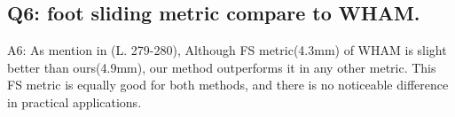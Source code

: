 \documentclass{article}
\begin{document}
\subsection{Q6: foot sliding metric compare to WHAM.}\label{q6-foot-sliding-metric-compare-to-wham.}

A6: As mention in (L. 279-280), Although FS metric(4.3mm) of WHAM is slight better than ours(4.9mm), our method outperforms it in any other metric. This FS metric is equally good for both methods, and there is no noticeable difference in practical applications.
\end{document}
